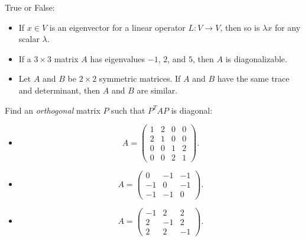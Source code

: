 \documentclass[12pt,a4paper]{article}
\theoremstyle{definition}
\begin{document}


\begin{questions}

\begin{question}
True or False:
\begin{itemize}
	\item If $x \in V$ is an eigenvector for a linear operator $L: V \to V$, then so is $\lambda x$ for any scalar $\lambda$.

	\item If a $3 \times 3$ matrix $A$ has eigenvalues $-1$, $2$, and $5$, then $A$ is diagonalizable.

	\item Let $A$ and $B$ be $2 \times 2$ symmetric matrices. If $A$ and $B$ have the same trace and determinant, then $A$ and $B$ are similar.
\end{itemize}
\end{question}

\begin{question}
Find an \emph{orthogonal} matrix $P$ such that $P^T A P$ is diagonal:
%
\begin{itemize}
	\item
	\[ A = \begin{pmatrix} 1 & 2 & 0 & 0 \\ 2 & 1 & 0 & 0 \\ 0 & 0 & 1 & 2 \\ 0 & 0 & 2 & 1 \end{pmatrix}. \]

	\item
	\[ A = \begin{pmatrix} 0 & -1 & -1 \\ -1 & 0 & -1 \\ -1 & -1 & 0 \end{pmatrix}. \]

	\item
	\[ A = \begin{pmatrix} -1 & 2 & 2 \\ 2 & -1 & 2 \\ 2 & 2 & -1 \end{pmatrix}. \]
\end{itemize}
\end{question}


\end{questions}
\end{document}
